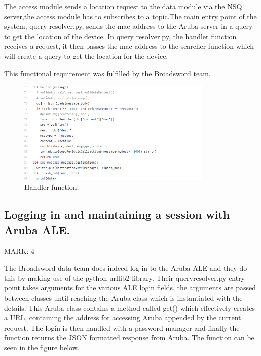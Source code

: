 \documentclass{article}
\begin{document}
\begin{flushleft}
The access module sends a location request to the data module via the NSQ server,the access module has to subscribes to a topic.The main entry point of the system, query resolver.py, sends the mac address to the Aruba server in a query to get the location of the device.
In query resolver.py, the handler function receives a request, it then passes the mac address to the searcher function-which will create a query to get the location for the device.
\end{flushleft}

\begin{flushleft}
This functional requirement was fulfilled by the Broadsword team.
\end{flushleft}
\begin{figure}[ht]
  \includegraphics[width=350px]{Handler.png}

\caption{Handler function.}
  \label{Handler function}
\end{figure}

\subsection{Logging in and maintaining a session with Aruba ALE.}

\begin{flushleft}
MARK: 4
\end{flushleft}

\begin{flushleft}
The Broadsword data team does indeed log in to the Aruba ALE and they do this by making use of the python urllib2 library. Their query\textunderscore resolver.py entry point takes arguments for the various ALE login fields, the arguments are passed between classes until reaching the Aruba class which is instantiated with the details. This Aruba class contains a method called get() which effectively creates a URL, containing the address for accessing Aruba appended by the current request. The login is then handled with a password manager and finally the function returns the JSON formatted response from Aruba. The function can be seen in the figure below.
\end{flushleft}
\end{document}
